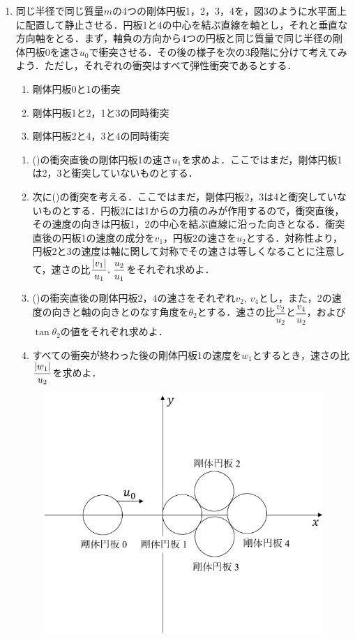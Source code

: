 \begin{enumerate}
\begin{figure}[H]
    \caption{}
  \end{figure}
  \item 同じ半径で同じ質量$m$の4つの剛体円板1，2，3，4を，図3のように水平面上に配置して静止させる．円板1と4の中心を結ぶ直線を\x 軸とし，それと垂直な方向\y 軸をとる．まず，\x 軸負の方向から4つの円板と同じ質量で同じ半径の剛体円板0を速さ$u_0$で衝突させる．その後の様子を次の3段階に分けて考えてみよう．ただし，それぞれの衝突はすべて弾性衝突であるとする．
  \begin{enumerate}
    \setlength{\leftskip}{0zw}
    \setlength{\itemindent}{1zw}\setlength{\labelsep}{1zw}
    \setlength{\labelwidth}{1zw}
    \item 剛体円板0と1の衝突
    \item 剛体円板1と2，1と3の同時衝突
    \item 剛体円板2と4，3と4の同時衝突
  \end{enumerate}
  \begin{enumerate}[（1）]
    \setlength{\leftskip}{-2zw}
    \setlength{\itemindent}{1zw}\setlength{\labelsep}{1zw}
    \setlength{\labelwidth}{1zw}
    \item ()の衝突直後の剛体円板1の速さ$u_1$を求めよ．ここではまだ，剛体円板1は2，3と衝突していないものとする．
    \item 次に()の衝突を考える．ここではまだ，剛体円板2，3は4と衝突していないものとする．円板2には1からの力積のみが作用するので，衝突直後，その速度の向きは円板1，2の中心を結ぶ直線に沿った向きとなる．衝突直後の円板1の速度の\x 成分を$v_1$，円板2の速さを$u_2$とする．対称性より，円板2と3の速度は\x 軸に関して対称でその速さは等しくなることに注意して，速さの比$\dfrac{\lvert v_1\rvert}{u_1},\,\dfrac{u_2}{u_1}$をそれぞれ求めよ．
    \item ()の衝突直後の剛体円板2，4の速さをそれぞれ$v_2,\,v_4$とし，また，2の速度の向きと\x 軸の向きとのなす角度を$\theta_2$とする．速さの比$\dfrac{v_2}{u_2}$と$\dfrac{v_4}{u_2}$，および$\tan{\theta_2}$の値をそれぞれ求めよ．
    \item すべての衝突が終わった後の剛体円板1の速度を$w_1$とするとき，速さの比$\dfrac{\lvert w_1\rvert}{u_2}$を求めよ．
  \end{enumerate}
  \begin{figure}[H]
    \centering
    \includegraphics[width=.55\columnwidth]{../graphs/open_19_8_1-3.png}
    \caption{}
  \end{figure}
\end{enumerate}



